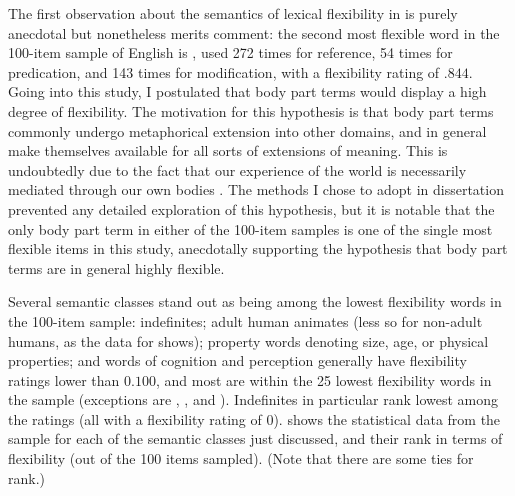 The first observation about the semantics of lexical flexibility in  is purely anecdotal but nonetheless merits comment: the second most flexible word in the 100-item sample of English is , used 272 times for reference, 54 times for predication, and 143 times for modification, with a flexibility rating of $.844$. Going into this study, I postulated that body part terms would display a high degree of flexibility. The motivation for this hypothesis is that body part terms commonly undergo metaphorical extension into other domains, and in general make themselves available for all sorts of extensions of meaning. This is undoubtedly due to the fact that our experience of the world is necessarily mediated through our own bodies \parencite{LakoffJohnson1980}. The methods I chose to adopt in dissertation prevented any detailed exploration of this hypothesis, but it is notable that the only body part term in either of the 100-item samples is one of the single most flexible items in this study, anecdotally supporting the hypothesis that body part terms are in general highly flexible.

Several semantic classes stand out as being among the lowest flexibility words in the 100-item  sample: indefinites; adult human animates (less so for non-adult humans, as the data for  shows); property words denoting size, age, or physical properties; and words of cognition and perception generally have flexibility ratings lower than $0.100$, and most are within the 25 lowest flexibility words in the sample (exceptions are , , and ). Indefinites in particular rank lowest among the ratings (all with a flexibility rating of $0$).  shows the statistical data from the sample for each of the semantic classes just discussed, and their rank in terms of flexibility (out of the 100 items sampled). (Note that there are some ties for rank.)

